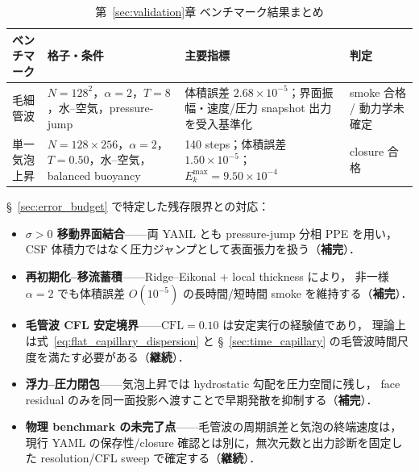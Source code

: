 \begin{table}[htbp]
\centering
\caption{第~\ref{sec:validation}章 ベンチマーク結果まとめ}
\label{tab:ch13_summary}
\renewcommand{\arraystretch}{1.4}
\begin{tabular}{p{2.2cm}p{3.2cm}p{5.1cm}p{2.0cm}}
\toprule
ベンチマーク & 格子・条件 & 主要指標 & 判定 \\
\midrule
毛細管波 &
  $N=128^2$，$\alpha=2$，$T=8$，水--空気，pressure-jump &
  体積誤差 $2.68{\times}10^{-5}$；界面振幅・速度/圧力 snapshot 出力を受入基準化 &
  smoke 合格 / 動力学未確定 \\
単一気泡上昇 &
  $N=128\times256$，$\alpha=2$，$T=0.50$，水--空気，balanced buoyancy &
  140 steps；体積誤差 $1.50{\times}10^{-5}$；$E_k^{\max}=9.50{\times}10^{-4}$ &
  closure 合格 \\
\bottomrule
\end{tabular}
\end{table}

§~\ref{sec:error_budget} で特定した残存限界との対応：
\begin{itemize}[noitemsep]
  \item \textbf{$\sigma > 0$ 移動界面結合}——両 YAML とも pressure-jump 分相 PPE を用い，
        CSF 体積力ではなく圧力ジャンプとして表面張力を扱う（\textbf{補完}）．
  \item \textbf{再初期化--移流蓄積}——Ridge--Eikonal + local thickness により，
        非一様 $\alpha=2$ でも体積誤差 $O(10^{-5})$ の長時間/短時間 smoke を維持する（\textbf{補完}）．
  \item \textbf{毛管波 CFL 安定境界}——$\mathrm{CFL}=0.10$ は安定実行の経験値であり，
        理論上は式~\eqref{eq:flat_capillary_dispersion} と
        §~\ref{sec:time_capillary} の毛管波時間尺度を満たす必要がある（\textbf{継続}）．
  \item \textbf{浮力--圧力閉包}——気泡上昇では hydrostatic 勾配を圧力空間に残し，
        face residual のみを同一面投影へ渡すことで早期発散を抑制する（\textbf{補完}）．
  \item \textbf{物理 benchmark の未完了点}——毛管波の周期誤差と気泡の終端速度は，
        現行 YAML の保存性/closure 確認とは別に，無次元数と出力診断を固定した
        resolution/CFL sweep で確定する（\textbf{継続}）．
\end{itemize}
